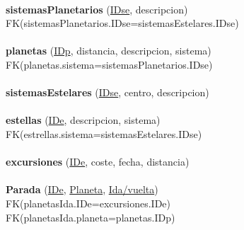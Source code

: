 \documentclass[a4paper,10pt]{article}
\newcommand\tab[1][1cm]{\hspace*{#1}}
\begin{document}
\paragraph{}
{\bf sistemasPlanetarios} (\underline{IDse}, descripcion)\\
\tab FK(sistemasPlanetarios.IDse=sistemasEstelares.IDse)

\paragraph{}
{\bf planetas} (\underline{IDp}, distancia, descripcion, sistema)\\
\tab FK(planetas.sistema=sistemasPlanetarios.IDse)

\paragraph{}
{\bf sistemasEstelares} (\underline{IDse}, centro, descripcion)

\paragraph{}
{\bf estellas} (\underline{IDe}, descripcion, sistema)\\
\tab FK(estrellas.sistema=sistemasEstelares.IDse)

\paragraph{}
{\bf excursiones} (\underline{IDe}, coste, fecha, distancia)

\paragraph{}
{\bf Parada} (\underline{IDe}, \underline{Planeta}, \underline{Ida/vuelta})\\
\tab FK(planetasIda.IDe=excursiones.IDe)\\
\tab FK(planetasIda.planeta=planetas.IDp)\\


%   
%   
\end{document}
